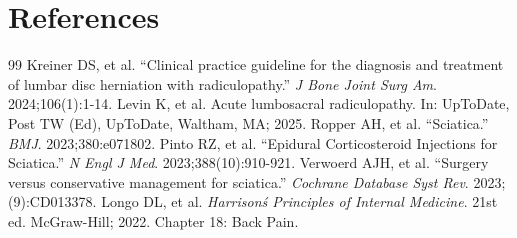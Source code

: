 \section*{References}
\begin{thebibliography}{99}
 Kreiner DS, et al. ``Clinical practice guideline for the diagnosis and treatment of lumbar disc herniation with radiculopathy.'' \emph{J Bone Joint Surg Am}. 2024;106(1):1-14.
 Levin K, et al. Acute lumbosacral radiculopathy. In: UpToDate, Post TW (Ed), UpToDate, Waltham, MA; 2025.
 Ropper AH, et al. ``Sciatica.'' \emph{BMJ}. 2023;380:e071802.
 Pinto RZ, et al. ``Epidural Corticosteroid Injections for Sciatica.'' \emph{N Engl J Med}. 2023;388(10):910-921.
 Verwoerd AJH, et al. ``Surgery versus conservative management for sciatica.'' \emph{Cochrane Database Syst Rev}. 2023;(9):CD013378.
 Longo DL, et al. \emph{Harrison\'s Principles of Internal Medicine}. 21st ed. McGraw-Hill; 2022. Chapter 18: Back Pain.
\end{thebibliography}
